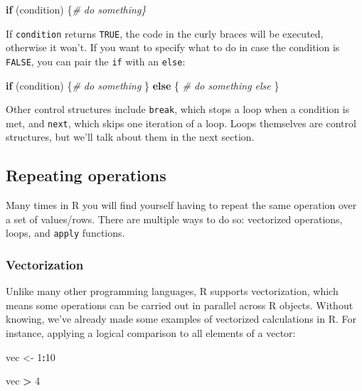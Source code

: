 \documentclass[
]{book}
\newenvironment{Shaded}{\begin{snugshade}}{\end{snugshade}}
\newcommand{\CommentTok}[1]{\textcolor[rgb]{0.56,0.35,0.01}{\textit{#1}}}
\newcommand{\ControlFlowTok}[1]{\textcolor[rgb]{0.13,0.29,0.53}{\textbf{#1}}}
\newcommand{\DecValTok}[1]{\textcolor[rgb]{0.00,0.00,0.81}{#1}}
\newcommand{\NormalTok}[1]{#1}
\newcommand{\OtherTok}[1]{\textcolor[rgb]{0.56,0.35,0.01}{#1}}
\newcommand{\SpecialCharTok}[1]{\textcolor[rgb]{0.81,0.36,0.00}{\textbf{#1}}}
\begin{document}
\begin{Shaded}
\begin{Highlighting}[]
\ControlFlowTok{if}\NormalTok{ (condition) \{}\CommentTok{\# do something\}}
\end{Highlighting}
\end{Shaded}

If \texttt{condition} returns \texttt{TRUE}, the code in the curly braces will be executed,
otherwise it won't. If you want to specify what to do in case the condition is
\texttt{FALSE}, you can pair the \texttt{if} with an \texttt{else}:

\begin{Shaded}
\begin{Highlighting}[]
\ControlFlowTok{if}\NormalTok{ (condition) \{}\CommentTok{\# do something}
\NormalTok{\} }\ControlFlowTok{else}\NormalTok{ \{}
    \CommentTok{\# do something else}
\NormalTok{  \}}
\end{Highlighting}
\end{Shaded}

Other control structures include \texttt{break}, which stops a loop when a condition
is met, and \texttt{next}, which skips one iteration of a loop. Loops themselves are
control structures, but we'll talk about them in the next section.

\hypertarget{repeating-operations}{%
\subsection{Repeating operations}\label{repeating-operations}}

Many times in R you will find yourself having to repeat the same operation over
a set of values/rows. There are multiple ways to do so: vectorized operations,
loops, and \texttt{apply} functions.

\hypertarget{vectorization}{%
\subsubsection{Vectorization}\label{vectorization}}

Unlike many other programming languages, R supports vectorization, which means
some operations can be carried out in parallel across R objects. Without
knowing, we've already made some examples of vectorized calculations in R. For
instance, applying a logical comparison to all elements of a vector:

\begin{Shaded}
\begin{Highlighting}[]
\NormalTok{vec }\OtherTok{\textless{}{-}} \DecValTok{1}\SpecialCharTok{:}\DecValTok{10}

\NormalTok{vec }\SpecialCharTok{\textgreater{}} \DecValTok{4}
\end{Highlighting}
\end{Shaded}
\end{document}
